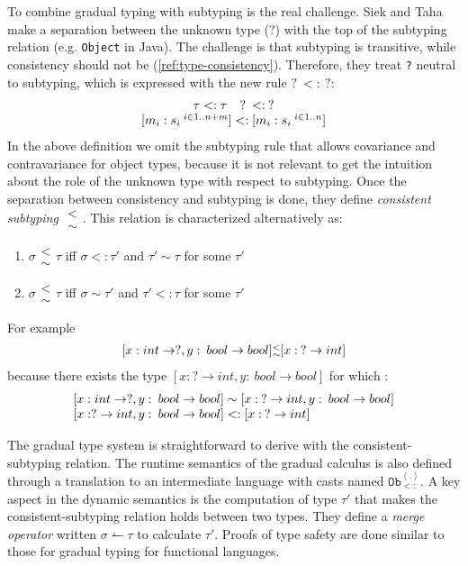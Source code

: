 \documentclass{article}
\newcommand\gcobj[0]{$\texttt{Ob}^{\left\langle . \right\rangle}_{<:}$}
\newcommand\csub[0]{\substack{<\\\sim}}
\newcommand\icode[1]{\texttt{#1}}
\begin{document}
 To combine gradual typing with subtyping is the real challenge. Siek and Taha make a separation between the unknown type (?) with the top of the subtyping relation (e.g. \icode{Object} in Java). The challenge is that subtyping is transitive, while consistency should not be (\ref{ref:type-consistency}). Therefore, they treat \icode{?} neutral to subtyping, which is expressed with the new rule $? \: <: \:?$:
\[
\begin{tabular}{c}
$\tau <: \tau \quad ? \: <: \:?$ \\
$[m_i : s_i \:^{i \in 1..n+m}] <: [m_i : s_i \:^{i \in 1..n}]$
\end{tabular}
\]
In the above definition we omit the subtyping rule that allows covariance and contravariance for object types, because it is not relevant to get the intuition about the role of the unknown type with respect to subtyping. Once the separation between consistency and subtyping is done, they define \emph{consistent subtyping} $\csub$. This relation is characterized alternatively as:
\begin{enumerate}
	\item $\sigma \csub \tau$ iff $\sigma <: \tau'$ and $\tau' \sim \tau$ for some $\tau'$
	\item $\sigma \csub \tau$ iff $\sigma \sim \tau'$ and $\tau' <: \tau$ for some $\tau'$
\end{enumerate}
For example
\[
\begin{tabular}{l}
$[x: int \rightarrow ?, y:\:bool \rightarrow bool ] \csub [x: \:? \rightarrow int]$ 
\end{tabular}
\]
because there exists the type $[x: ? \rightarrow int, y:\:bool \rightarrow bool]$ for which :
\[
\begin{tabular}{l}
$[x: int \rightarrow ?, y:\:bool \rightarrow bool] \sim [x: \:? \rightarrow int, y:\:bool \rightarrow bool]$  \\
$[x: ? \rightarrow int, y:\:bool \rightarrow bool] <: [x: \:? \rightarrow int] $ 
\end{tabular}
\]

The gradual type system is straightforward to derive with the consistent-subtyping relation. The runtime semantics of the gradual calculus is also defined through a translation to an intermediate language with casts named \gcobj. A key aspect in the dynamic semantics is the computation of type $\tau'$ that makes the consistent-subtyping relation holds between two types. They define a \emph{merge operator} written $\sigma \leftharpoonup \tau$ to calculate $\tau'$. Proofs of type safety are done similar to those for gradual typing for functional languages.
\end{document}
